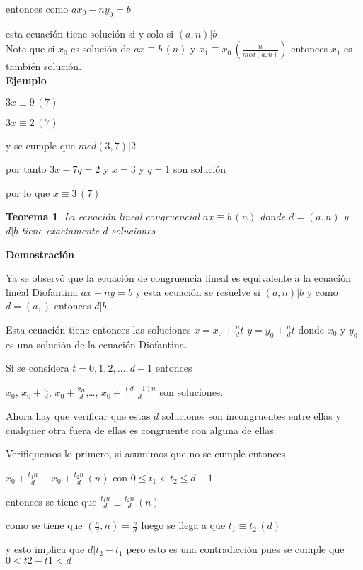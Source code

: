 \documentclass[a4paper,12pt]{report}
\newtheorem*{teo}{Teorema}
\begin{document}
entonces como $ax_0-ny_0=b$ 

esta ecuación tiene solución si y solo si $(a,n)|b$\\


Note que si $x_0$ es solución de  $ax\equiv b \, (n)$ y $x_1\equiv x_0\, (\frac{n}{mcd(a,n)})$ entonces $x_1$ es también solución.\\

\textbf{Ejemplo}

$3x\equiv 9\, (7)$

$3x\equiv 2\, (7)$

y se cumple que $mcd(3,7)|2$

por tanto $3x-7q=2$ y $x=3$ y $q=1$ son solución

por lo que $x\equiv 3\, (7)$



\begin{teo}
 La ecuación lineal congruencial $ax\equiv b \, (n)$ donde $d=(a,n)$ y $d|b$ tiene exactamente $d$ soluciones\\
\end{teo}



\textbf{Demostración}

Ya se observó que la ecuación de congruencia lineal es equivalente a la ecuación lineal Diofantina $ax-ny=b$ y esta ecuación se resuelve si $(a,n)|b$ y como $d=(a,)$ entonces $d|b$.

Esta ecuación tiene entonces las soluciones $x=x_0 + \frac{n}{d}t$ $y=y_0 + \frac{a}{d}t$ donde $x_0$ y $y_0$ es una solución de la ecuación Diofantina.

Si se considera $t=0,1,2,\dots,d-1$ entonces 

$x_0$, $x_0 + \frac{n}{d}$, $x_0 + \frac{2n}{d}$,\dots, $x_0 + \frac{(d-1)n}{d}$ son soluciones.

Ahora hay que verificar que estas $d$ soluciones son incongruentes entre ellas y cualquier otra fuera de ellas es congruente con alguna de ellas.

Verifiquemos lo primero, si asumimos que no se cumple entonces 

$x_0 + \frac{t_1n}{d} \equiv x_0 + \frac{t_2n}{d} \, (n)$ con $0\leq t_1 < t_2 \leq d-1$

entonces se tiene que $\frac{t_1n}{d} \equiv \frac{t_2n}{d} \, (n)$

como se tiene que $(\frac{n}{d},n)=\frac{n}{d}$ luego se llega a que $t_1\equiv t_2 \, (d)$

y esto implica que $d|t_2-t_1$ pero esto es una contradicción pues se cumple que $0<t2-t1<d$
\end{document}

